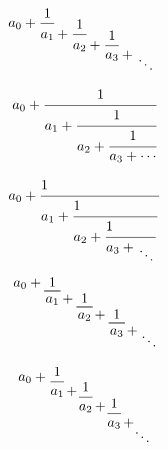 \documentclass{article}
\begin{document}
	\newcommand*{\cofrac}[2]{%
		{%
			\rlap{$\dfrac{1}{\phantom{#1}}$}%
			\genfrac{}{}{0pt}{0}{}{#1+#2}%
		}%
	}
	\[
	a_0 +
	\cofrac{a_1}{
		\cofrac{a_2}{
			\cofrac{a_3}{
				\genfrac{}{}{0pt}{0}{}{\ddots}
	}}}
	\]
	
	\begin{equation*}
		a_0+\cfrac{1}{a_1+\cfrac{1}{a_2+\cfrac{1}{a_3+\cdots}}}
	\end{equation*}

	\def\cof#1{\displaystyle{1\strut\hfill\over #1}}
	$$ a_0 + \cof{a_1 + \cof{a_2 + \cof{a_3 + {\atop\ddots}}}} $$
	
	\newcommand*{\underBracket}[2][1]{\underbracket[.6pt][0pt]{~#1\vphantom{g}~}_{\displaystyle #2\vphantom{g+1}}}
	\begin{equation}
		a_0 + \underBracket{a_1\mathrlap{{}+ \underBracket{a_2\mathrlap{{} + \underBracket{a_3\mathrlap{{}+{}\raise-2.2ex\hbox{$\smash\ddots$}}}}}}}
		\hphantom{a_1 + a_2 + a_3 + {}} %
	\end{equation}

	\[
		a_0+
		\raisebox{-.25\height}{$\dfrac{1}{a_1\mathrlap{\,+}}$}\mkern15mu
		\raisebox{-1.1\height}{$\dfrac{1}{a_2\mathrlap{\,+}}$}\mkern15mu
		\raisebox{-2.0\height}{$\dfrac{1}{a_3\mathrlap{\,+}}$}\mkern15mu
		\raisebox{-3\height}{$\ddots$}
	\]
\end{document}
